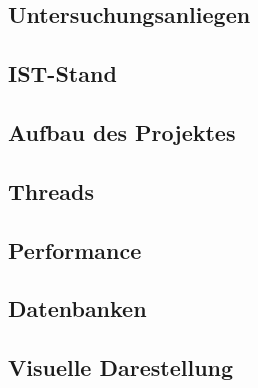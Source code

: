 \begin{spacing}{1}
    \section{Untersuchungsanliegen}\label{section:untersuchungsanliegenFlexlogger}
    \end{spacing}


\begin{spacing}{1}
    \section{IST-Stand}\label{section:ist-standFlexlogger}
    \end{spacing}


\begin{spacing}{1}
    \section{Aufbau des Projektes}\label{section:aufbaudesProjektesFlexlogger}
    \end{spacing}


\begin{spacing}{1}
    \section{Threads}\label{section:threads}
    \end{spacing}


\begin{spacing}{1}
    \section{Performance}\label{section:performance}
    \end{spacing}


\begin{spacing}{1}
    \section{Datenbanken}\label{section:database}
    \end{spacing}


\begin{spacing}{1}
    \section{Visuelle Darestellung}\label{section:gui}
    \end{spacing}


